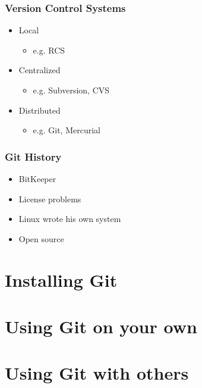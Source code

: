 \documentclass{git_course}
\begin{document}
\begin{frame}
\frametitle{Version Control Systems}
\begin{itemize}
    \item Local
    \begin{itemize}
        \item e.g. RCS
    \end{itemize}
    \item Centralized
    \begin{itemize}
        \item e.g. Subversion, CVS
    \end{itemize}
    \item Distributed
    \begin{itemize}
        \item e.g. Git, Mercurial
    \end{itemize}
\end{itemize}
\end{frame}

\begin{frame}
    \frametitle{Git History}
    \begin{itemize}
        \item BitKeeper
        \item License problems
        \item Linux wrote his own system
        \item Open source
    \end{itemize}
\end{frame}


\section{Installing Git}


\section{Using Git on your own}


\section{Using Git with others}
\end{document}
